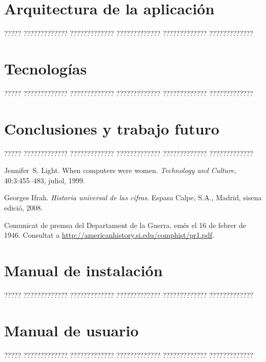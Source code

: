 \documentclass[11pt,spanish,
		listoftables,listoffigures]
		{tfgplantilla}
\begin{document}
\chapter{Arquitectura de la aplicaci\'on}

????? ????????????? ????????????? ????????????? ????????????? ?????????????

\chapter{Tecnolog\'ias}

????? ????????????? ????????????? ????????????? ????????????? ?????????????

\chapter{Conclusiones y trabajo futuro}

????? ????????????? ????????????? ????????????? ????????????? ????????????? 

\begin{thebibliography}{10}

   Jennifer~S. Light.
   \newblock When computers were women.
   \newblock \textit{Technology and Culture}, 40:3:455--483, juliol, 1999.

   Georges Ifrah.
   \newblock \textit{Historia universal de las cifras}.
   \newblock Espasa Calpe, S.A., Madrid, sisena edició, 2008.


   Comunicat de premsa del Departament de la Guerra, 
   emés el 16 de febrer de 1946. 
   \newblock Consultat a 
   \url{http://americanhistory.si.edu/comphist/pr1.pdf}.

\end{thebibliography}
\cleardoublepage


\APPENDIX


\chapter{Manual de instalación}

????? ????????????? ????????????? ????????????? ????????????? ?????????????

\chapter{Manual de usuario}

????? ????????????? ????????????? ????????????? ????????????? ?????????????
\end{document}
